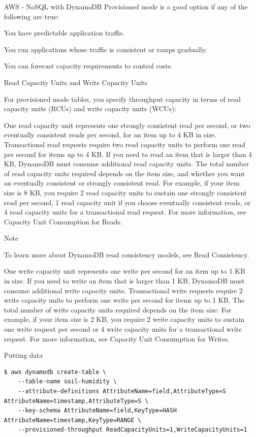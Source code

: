 \begin{frame}{AWS - NoSQL with DynamoDB}
Provisioned mode is a good option if any of the following are true:

    You have predictable application traffic.

    You run applications whose traffic is consistent or ramps gradually.

    You can forecast capacity requirements to control costs.



Read Capacity Units and Write Capacity Units

For provisioned mode tables, you specify throughput capacity in terms of read capacity units (RCUs) and write capacity units (WCUs):

    One read capacity unit represents one strongly consistent read per second, or two eventually consistent reads per second, for an item up to 4 KB in size. Transactional read requests require two read capacity units to perform one read per second for items up to 4 KB. If you need to read an item that is larger than 4 KB, DynamoDB must consume additional read capacity units. The total number of read capacity units required depends on the item size, and whether you want an eventually consistent or strongly consistent read. For example, if your item size is 8 KB, you require 2 read capacity units to sustain one strongly consistent read per second, 1 read capacity unit if you choose eventually consistent reads, or 4 read capacity units for a transactional read request. For more information, see Capacity Unit Consumption for Reads.

Note

To learn more about DynamoDB read consistency models, see Read Consistency.

One write capacity unit represents one write per second for an item up to 1 KB in size. If you need to write an item that is larger than 1 KB, DynamoDB must consume additional write capacity units. Transactional write requests require 2 write capacity units to perform one write per second for items up to 1 KB. The total number of write capacity units required depends on the item size. For example, if your item size is 2 KB, you require 2 write capacity units to sustain one write request per second or 4 write capacity units for a transactional write request. For more information, see Capacity Unit Consumption for Writes.



Putting data

\begin{lstlisting}
$ aws dynamodb create-table \
    --table-name soil-humidity \
    --attribute-definitions AttributeName=field,AttributeType=S AttributeName=timestamp,AttributeType=S \
    --key-schema AttributeName=field,KeyType=HASH AttributeName=timestamp,KeyType=RANGE \
    --provisioned-throughput ReadCapacityUnits=1,WriteCapacityUnits=1


\end{lstlisting}
\end{frame}
